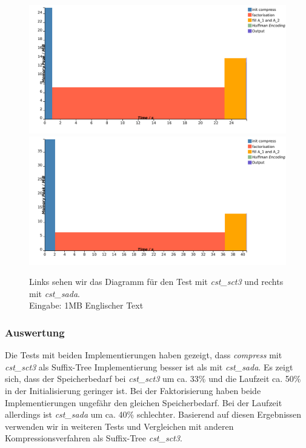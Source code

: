 \documentclass[a4paper,11pt]{scrartcl}%
\theoremstyle{change}
\theoremstyle{nonumberplain}
\theoremstyle{change}
\theoremstyle{nonumberplain}
\theoremstyle{change}
\theoremstyle{nonumberplain}
\begin{document}
\begin{figure}[h]
	\includegraphics[scale=0.31]{./pics/1MB_english_sct3}
	\includegraphics[scale=0.31]{./pics/1MB_english_sada}
	\caption{Links sehen wir das Diagramm für den Test mit \textit{cst\_sct3} und rechts mit \textit{cst\_sada}.\\ Eingabe: 1MB Englischer Text}
	\label{fig:suffix_trees_test_english}
\end{figure}

\subsubsection{Auswertung}

Die Tests mit beiden Implementierungen haben gezeigt, dass \textit{compress} mit \textit{cst\_sct3} als Suffix-Tree Implementierung besser ist als mit \textit{cst\_sada}. Es zeigt sich, dass der Speicherbedarf bei \textit{cst\_sct3} um ca. 33\% und die Laufzeit ca. 50\% in der Initialisierung geringer ist. Bei der Faktorisierung haben beide Implementierungen ungefähr den gleichen Speicherbedarf. Bei der Laufzeit allerdings ist \textit{cst\_sada} um ca. 40\% schlechter. 
\newline
Basierend auf diesen Ergebnissen verwenden wir in weiteren Tests und Vergleichen mit anderen Kompressionsverfahren als Suffix-Tree \textit{cst\_sct3}.


\newpage
\newpage
	
\end{document}
